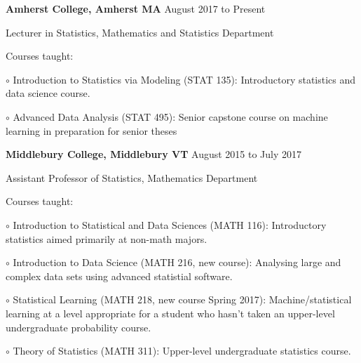 \documentclass[10pt]{article}
\newcommand{\halfblankline}{\quad\vspace{-0.5\baselineskip}\pagebreak[3]}
\begin{document}
\textbf{Amherst College, Amherst MA} \hfill {August 2017 to Present}
\begin{outerlist}
 	\item[] Lecturer in Statistics, Mathematics and Statistics Department
    	\begin{innerlist}
		\item Courses taught:
		\begin{innerlist}
		\item[$\circ$] Introduction to Statistics via Modeling (STAT 135): Introductory statistics and 
		data science course.
		\item[$\circ$] Advanced Data Analysis (STAT 495): Senior capstone course on machine 
		learning in preparation for senior theses
		\end{innerlist}
	\end{innerlist}
\end{outerlist}

\halfblankline

\textbf{Middlebury College, Middlebury VT} \hfill {August 2015 to July 2017}
\begin{outerlist}
 	\item[] Assistant Professor of Statistics, Mathematics Department
    	\begin{innerlist}
		\item Courses taught:
		\begin{innerlist}
		\item[$\circ$] Introduction to Statistical and Data Sciences (MATH 116):  Introductory
		statistics aimed primarily at non-math majors.
		\item[$\circ$] Introduction to Data Science (MATH 216, new course): Analysing large and complex data sets using advanced statistial software.
		\item[$\circ$] Statistical Learning (MATH 218, new course Spring 2017): Machine/statistical learning at a level appropriate for a student who hasn't taken an upper-level undergraduate
		probability course.
		\item[$\circ$] Theory of Statistics (MATH 311): Upper-level undergraduate
		statistics course.
		\end{innerlist}
	\end{innerlist}
\end{outerlist}

\halfblankline
\end{document}
